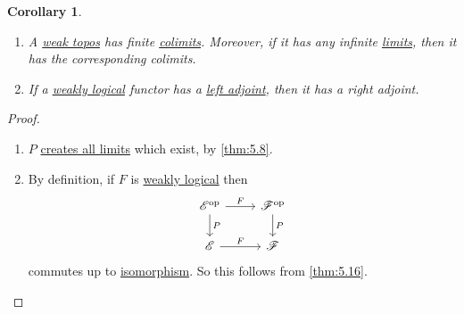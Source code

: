 \documentclass{article}
\newtheorem{ncor}[nthm]{Corollary}
\begin{document}
\begin{ncor}\label{lem:7.10}\leavevmode
  \begin{enumerate}[label=(\roman*)]
    \item A \hyperlink{def:wtopos}{weak topos} has finite \hyperlink{def:limit}{colimits}.
      Moreover, if it has any infinite \hyperlink{def:limit}{limits}, then it has the corresponding colimits.
    \item If a \hyperlink{def:wtopos}{weakly logical} functor has a \hyperlink{def:adj}{left adjoint}, then it has a right adjoint.
  \end{enumerate}
\end{ncor}
\begin{proof}\leavevmode
  \begin{enumerate}[label=(\roman*)]
    \item $P$ \hyperlink{def:clim}{creates all limits} which exist, by \cref{thm:5.8}.
    \item By definition, if $F$ is \hyperlink{def:wtopos}{weakly logical} then
      \begin{equation*}
      \begin{tikzcd}
        \mathscr{E}^\text{op} \rar{F} \dar{P}& \mathscr{F}^\text{op} \dar{P}\\
        \mathscr{E} \rar{F} & \mathscr{F}
      \end{tikzcd}
      \end{equation*}
      commutes up to \hyperlink{def:iso}{isomorphism}. So this follows from \cref{thm:5.16}.
  \end{enumerate}
\end{proof}
\end{document}
